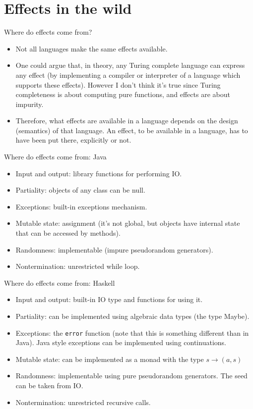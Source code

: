 \documentclass{beamer}
\begin{document}
\section{Effects in the wild}

\begin{frame}{Where do effects come from?}
\begin{itemize}
	\item Not all languages make the same effects available.
	\item One could argue that, in theory, any Turing complete language can express any effect (by implementing a compiler or interpreter of a language which supports these effects). However I don't think it's true since Turing completeness is about computing pure functions, and effects are about impurity.
	\item Therefore, what effects are available in a language depends on the design (semantics) of that language. An effect, to be available in a language, has to have been put there, explicitly or not.
\end{itemize}
\end{frame}

\begin{frame}{Where do effects come from: Java}
\begin{itemize}
	\item Input and output: library functions for performing IO.
	\item Partiality: objects of any class can be null.
	\item Exceptions: built-in exceptions mechanism.
	\item Mutable state: assignment (it's not global, but objects have internal state that can be accessed by methods).
	\item Randomness: implementable (impure pseudorandom generators).
	\item Nontermination: unrestricted while loop.
\end{itemize}
\end{frame}

\begin{frame}{Where do effects come from: Haskell}
\begin{itemize}
	\item Input and output: built-in IO type and functions for using it.
	\item Partiality: can be implemented using algebraic data types (the type Maybe).
	\item Exceptions: the \texttt{error} function (note that this is something different than in Java). Java style exceptions can be implemented using continuations.
	\item Mutable state: can be implemented as a monad with the type $s \to (a, s)$
	\item Randomness: implementable using pure pseudorandom generators. The seed can be taken from IO.
	\item Nontermination: unrestricted recursive calls.
\end{itemize}
\end{frame}
\end{document}
